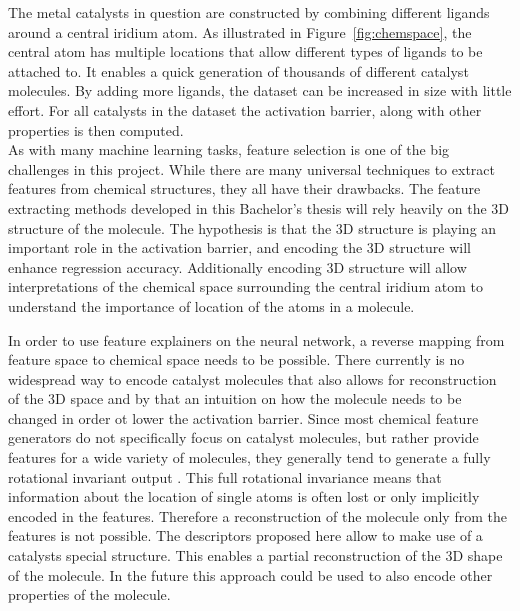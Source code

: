 The metal catalysts in question are constructed by combining different ligands around a central iridium atom.
As illustrated in Figure~\ref{fig:chemspace}, the central atom has multiple locations that allow different types of ligands to be attached to.  
It enables a quick generation of thousands of different catalyst molecules.
By adding more ligands, the dataset can be increased in size with little effort.
For all catalysts in the dataset the activation barrier, along with other properties is then computed.
\\
As with many machine learning tasks, feature selection is one of the big challenges in this project.
While there are many universal techniques to extract features from chemical structures, they all have their drawbacks.
The feature extracting methods developed in this Bachelor's thesis will rely heavily on the 3D structure of the molecule.
The hypothesis is that the 3D structure is playing an important role in the activation barrier, and encoding the 3D structure will enhance regression accuracy.
Additionally encoding 3D structure will allow interpretations of the chemical space surrounding the central 
iridium atom to understand the importance of location of the atoms in a molecule.

In order to use feature explainers on the neural network, a reverse mapping from feature space to chemical space needs to be possible.
There currently is no widespread way to encode catalyst molecules that also allows for 
reconstruction of the 3D space and by that an intuition on how the molecule needs to be changed in order ot lower the activation barrier.
Since most chemical feature generators do not specifically focus on catalyst molecules,
but rather provide features for a wide variety of molecules, they generally tend to generate a fully rotational invariant output \cite{Bart_k_2013}.
This full rotational invariance means that information about the location of single atoms is often lost or only implicitly encoded in the features.
Therefore a reconstruction of the molecule only from the features is not possible.
The descriptors proposed here allow to make use of a catalysts special structure.
This enables a partial reconstruction of the 3D shape of the molecule.
In the future this approach could be used to also encode other properties of the molecule.
\\

